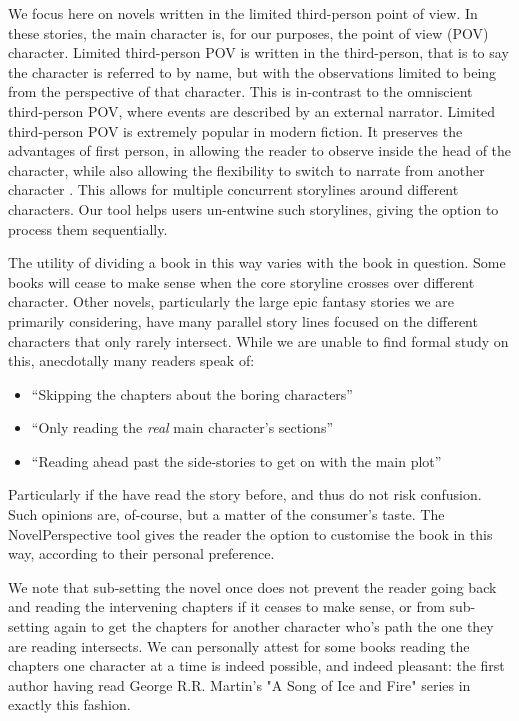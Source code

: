 \documentclass[11pt,a4paper]{article}
\newcommand{\parencite}{\citep}
\begin{document}
We focus here on novels written in the limited third-person point of view.
In these stories, the main character is, for our purposes, the point of view (POV) character.
Limited third-person POV is written in the third-person, that is to say the character is referred to by name, but with the observations limited to being from the perspective of that character.
This is in-contrast to the omniscient third-person POV, where events are described by an external narrator.
Limited third-person POV is extremely popular in modern fiction.
It preserves the advantages of first person, in allowing the reader to observe inside the head of the character, while also allowing the flexibility to switch to narrate from another character \parencite{booth2010rhetoric}.
This allows for multiple concurrent storylines around different characters.
Our tool helps users un-entwine such storylines, giving the option to process them sequentially.


The utility of dividing a book in this way varies with the book in question.
Some books will cease to make sense when the core storyline crosses over different character.
Other novels, particularly the large epic fantasy stories we are primarily considering,
have many parallel story lines focused on the different characters that only rarely intersect.
While we are unable to find formal study on this, 
anecdotally many readers speak of:
\begin{itemize}
	\item ``Skipping the chapters about the boring characters''
	\item ``Only reading the \emph{real} main character's sections''
	\item ``Reading ahead past the side-stories to get on with the main plot''	
\end{itemize}
Particularly if the have read the story before, and thus do not risk confusion.
Such opinions are, of-course, but a matter of the consumer's taste.
The NovelPerspective tool gives the reader the option to customise the book in this way, according to their personal preference.

We note that sub-setting the novel once does not prevent the reader going back and reading the intervening chapters if it ceases to make sense, or from sub-setting again to get the chapters for another character who's path the one they are reading intersects.
We can personally attest for some books reading the chapters one character at a time is indeed possible, and indeed pleasant: the first author having read George R.R. Martin's "A Song of Ice and Fire" series in exactly this fashion.
\end{document}
